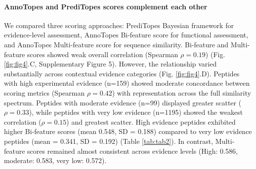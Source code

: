 \documentclass[times, twoside, watermark]{zHenriquesLab-StyleBioRxiv}
\begin{document}
            \paragraph{AnnoTopes and PrediTopes scores complement each other}
                We compared three scoring approaches: PrediTopes Bayesian framework for evidence-level assessment, AnnoTopes Bi-feature score for functional assessment, and AnnoTopes Multi-feature score for sequence similarity.
                Bi-feature and Multi-feature scores showed weak overall correlation (Spearman $\rho = 0.19$) (Fig. \ref{fig:fig4}.C, Supplementary Figure 5). However, the relationship varied substantially across contextual evidence categories (Fig. \ref{fig:fig4}.D). Peptides with high experimental evidence (n=159) showed moderate concordance between scoring metrics (Spearman $\rho = 0.42$) with representation across the full similarity spectrum. Peptides with moderate evidence (n=99) displayed greater scatter ($\rho = 0.33$), while peptides with very low evidence (n=1195) showed the weakest correlation ($\rho = 0.15$) and greatest scatter.
                High evidence peptides exhibited higher Bi-feature scores (mean 0.548, SD = 0.188) compared to very low evidence peptides (mean = 0.341, SD = 0.192) (Table \ref{tab:tab2}). In contrast, Multi-feature scores remained almost consistent across evidence levels (High: 0.586, moderate: 0.583, very low: 0.572).
            
\end{document}
